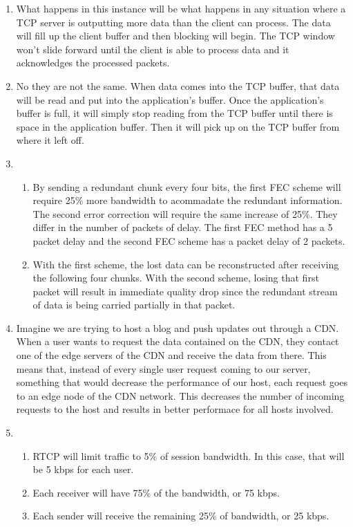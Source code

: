 


\begin{enumerate}
    \item What happens in this instance will be what happens in any situation where a TCP server is outputting more data than the client can process. The data will fill up the client buffer and then blocking will begin. The TCP window won't slide forward until the client is able to process data and it acknowledges the processed packets. 

    \item No they are not the same. When data comes into the TCP buffer, that data will be read and put into the application's buffer. Once the application's buffer is full, it will simply stop reading from the TCP buffer until there is space in the application buffer. Then it will pick up on the TCP buffer from where it left off.

    \item \begin{enumerate}
        \item By sending a redundant chunk every four bits, the first FEC scheme will require 25\% more bandwidth to acommadate the redundant information. The second error correction will require the same increase of 25\%. They differ in the number of packets of delay. The first FEC method has a 5 packet delay and the second FEC scheme has a packet delay of 2 packets.

        \item With the first scheme, the lost data can be reconstructed after receiving the following four chunks. With the second scheme, losing that first packet will result in immediate quality drop since the redundant stream of data is being carried partially in that packet.
    \end{enumerate}

    \item Imagine we are trying to host a blog and push updates out through a CDN. When a user wants to request the data contained on the CDN, they contact one of the edge servers of the CDN and receive the data from there. This means that, instead of every single user request coming to our server, something that would decrease the performance of our host, each request goes to an edge node of the CDN network. This decreases the number of incoming requests to the host and results in better performace for all hosts involved.

    \item \begin{enumerate}
        \item RTCP will limit traffic to 5\% of session bandwidth. In this case, that will be 5 kbps for each user.

        \item Each receiver will have 75\% of the bandwidth, or 75 kbps.

        \item Each sender will receive the remaining 25\% of bandwidth, or 25 kbps.
    \end{enumerate}

\end{enumerate}



